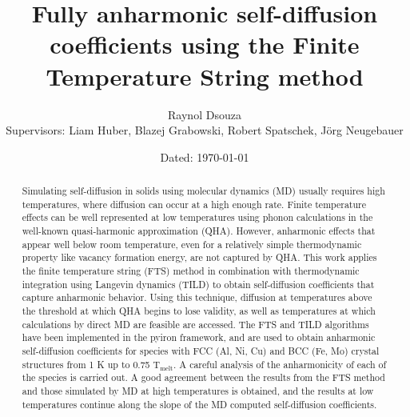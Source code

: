 \documentclass{article}
\title{Fully anharmonic self-diffusion coefficients using the Finite Temperature String method}
\date{\small Dated: \today}
\author{Raynol Dsouza\\[0.5cm] {Supervisors: Liam Huber, Blazej Grabowski, Robert Spatschek, Jörg Neugebauer}}
\affil{Max Planck Institut für Eisenforschung, Düsseldorf}
\begin{document}
\maketitle
{}

\newpage
\begin{abstract}
\normalsize
Simulating self-diffusion in solids using molecular dynamics (MD) usually requires high temperatures, where diffusion can occur at a high enough rate. Finite temperature effects can be well represented at low temperatures using phonon calculations in the well-known quasi-harmonic approximation (QHA). However, anharmonic effects that appear well below room temperature, even for a relatively simple thermodynamic property like vacancy formation energy, are not captured by QHA. This work applies the finite temperature string (FTS) method in combination with thermodynamic integration using Langevin dynamics (TILD) to obtain self-diffusion coefficients that capture anharmonic behavior. Using this technique, diffusion at temperatures above the threshold at which QHA begins to lose validity, as well as temperatures at which calculations by direct MD are feasible are accessed. The FTS and TILD algorithms have been implemented in the pyiron framework, and are used to obtain anharmonic self-diffusion coefficients for species with FCC (Al, Ni, Cu) and BCC (Fe, Mo) crystal structures from 1 K up to 0.75 $\mathrm{T_{melt}}$. A careful analysis of the anharmonicity of each of the species is carried out. A good agreement between the results from the FTS method and those simulated by MD at high temperatures is obtained, and the results at low temperatures continue along the slope of the MD computed self-diffusion coefficients. 
\end{abstract}
\end{document}
